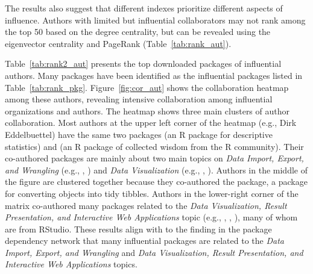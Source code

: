 The results also suggest that different indexes prioritize different aspects of influence. Authors with limited but influential collaborators may not rank among the top 50 based on the degree centrality, but can be revealed using the eigenvector centrality and PageRank (Table~\ref{tab:rank_aut}). %


Table~\ref{tab:rank2_aut} presents the top downloaded packages of influential authors. Many packages have been identified as the influential packages listed in Table~\ref{tab:rank_pkg}. Figure~\ref{fig:cor_aut} shows the collaboration heatmap among these authors, revealing intensive collaboration among influential organizations and authors. The heatmap shows three main clusters of author collaboration. Most authors at the upper left corner of the heatmap (e.g., Dirk Eddelbuettel) have the same two packages  (an R package for descriptive statistics) and  (an R package of collected wisdom from the R community). Their co-authored packages are mainly about two main topics on {\it Data Import, Export, and Wrangling} (e.g., , ) and {\it Data Visualization} (e.g., , ). Authors in the middle of the figure are clustered together because they co-authored the  package, a package for converting objects into tidy tibbles. Authors in the lower-right corner of the matrix co-authored many packages related to the {\it Data Visualization, Result Presentation, and Interactive Web Applications} topic (e.g., , , ), many of whom are from RStudio. These results align with to the finding in the package dependency network that many influential packages are related to the {\it Data Import, Export, and Wrangling} and {\it Data Visualization, Result Presentation, and Interactive Web Applications} topics.


